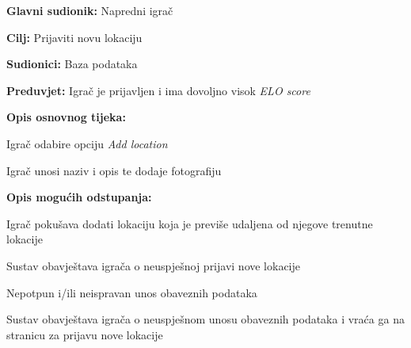 					\noindent {}
					\begin{packed_item}
	
						\item \textbf{Glavni sudionik: }Napredni igrač
						\item  \textbf{Cilj:} Prijaviti novu lokaciju
						\item  \textbf{Sudionici:} Baza podataka
						\item  \textbf{Preduvjet:} Igrač je prijavljen i ima dovoljno visok \textit{ELO score}
						\item  \textbf{Opis osnovnog tijeka:}
						
						\item[] \begin{packed_enum}
	
							\item Igrač odabire opciju \textit{Add location}
							\item Igrač unosi naziv i opis te dodaje fotografiju

						\end{packed_enum}
						
						\item  \textbf{Opis mogućih odstupanja:}
						
						\item[] \begin{packed_item}
	
							\item[1.a] Igrač pokušava dodati lokaciju koja je previše udaljena od njegove trenutne lokacije
							\item[] \begin{packed_enum}
								
								\item Sustav obavještava igrača o neuspješnoj prijavi nove lokacije
								
							\end{packed_enum}
							
							\item[2.a] Nepotpun i/ili neispravan unos obaveznih podataka
							\item[] \begin{packed_enum}
								
								\item Sustav obavještava igrača o neuspješnom unosu obaveznih podataka i vraća ga na stranicu za prijavu nove lokacije
								
							\end{packed_enum}
							
						\end{packed_item}
					\end{packed_item}
					
